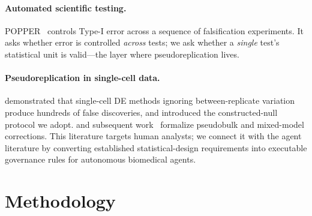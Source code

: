 \documentclass[pmlr,twocolumn,10pt]{jmlr}
\begin{document}
\paragraph{Automated scientific testing.}
POPPER~\citep{popper2025} controls Type-I error across a sequence of
falsification experiments. It asks whether error is controlled
\textit{across} tests; we ask whether a \textit{single} test's statistical unit
is valid---the layer where pseudoreplication lives.

\paragraph{Pseudoreplication in single-cell data.}
\citet{squair2021} demonstrated that single-cell DE methods ignoring
between-replicate variation produce hundreds of false discoveries, and introduced
the constructed-null protocol we adopt. \citet{zimmerman2021} and subsequent
work~\citep{nested2025} formalize pseudobulk and mixed-model corrections. This
literature targets human analysts; we connect it with the agent literature by
converting established statistical-design requirements into executable
governance rules for autonomous biomedical agents.

\section{Methodology}
\end{document}
